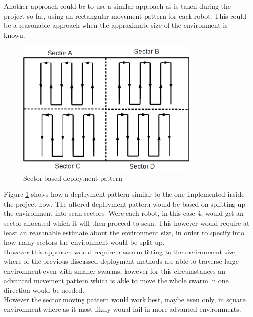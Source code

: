 Another approach could be to use a similar approach as is taken during the project so far, using an rectangular movement pattern for each robot. This could be a reasonable approach when the approximate size of the environment is known.

\begin{figure}[h]
\centering
\includegraphics[width = 0.8\textwidth]{../../figures/deployment_sector_pattern} 
\caption{Sector based deployment pattern}
\label{deployment_sector_pattern}
\end{figure}

Figure \ref{deployment_sector_pattern} shows how a deployment pattern similar to the one implemented inside the project now. 
The altered deployment pattern would be based on splitting up the environment into scan sectors. Were each robot, in this case 4, would get an sector allocated which it will then proceed to scan. This however would require at least an reasonable estimate about  the environment size, in order to specify into how many sectors the environment would be split up. \\[3ex]

However this approach would require a swarm fitting to the environment size, where of the previous discussed deployment methods are able to traverse large environment even with smaller swarms, however for this circumstances an advanced movement pattern which is able to move the whole swarm in one direction would be needed.\\
However the sector moving pattern would work best, maybe even only, in square environment where as it most likely would fail in more advanced environments.

